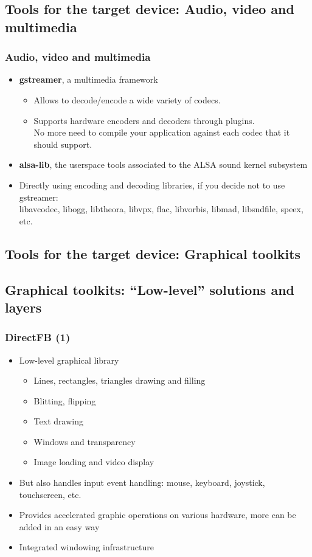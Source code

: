 \subsection[Multimedia tools]{Tools for the target device: Audio,
  video and multimedia}

\begin{frame}
  \frametitle{Audio, video and multimedia}
  \begin{itemize}
  \item {\bf gstreamer}, a multimedia framework
    \begin{itemize}
    \item Allows to decode/encode a wide variety of codecs.
    \item Supports hardware encoders and decoders through plugins.\\
      No more need to compile your application against each codec that
      it should support.
    \end{itemize}
  \item {\bf alsa-lib}, the userspace tools associated to the ALSA sound
    kernel subsystem
  \item Directly using encoding and decoding libraries, if you decide
    not to use gstreamer:\\
    libavcodec, libogg, libtheora, libvpx, flac, libvorbis, libmad,
    libsndfile, speex, etc.
  \end{itemize}
\end{frame}

\subsection[Graphical toolkits]{Tools for the target device: Graphical
  toolkits}

\subsection[Low-level toolkits]{Graphical toolkits:
``Low-level'' solutions and layers}

\begin{frame}
  \frametitle{DirectFB (1)}
  \begin{itemize}
  \item Low-level graphical library
    \begin{itemize}
    \item Lines, rectangles, triangles drawing and filling
    \item Blitting, flipping
    \item Text drawing
    \item Windows and transparency
    \item Image loading and video display
    \end{itemize}
  \item But also handles input event handling: mouse, keyboard, joystick,
    touchscreen, etc.
  \item Provides accelerated graphic operations on various hardware, more can be
    added in an easy way
  \item Integrated windowing infrastructure
  \end{itemize}
\end{frame}

